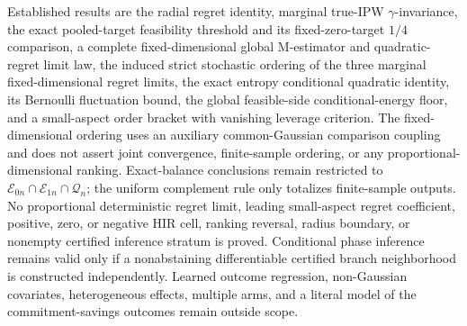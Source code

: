 \documentclass{article}
\begin{document}
Established results are the radial regret identity, marginal true-IPW \(\gamma\)-invariance, the exact pooled-target feasibility threshold and its fixed-zero-target \(1/4\) comparison, a complete fixed-dimensional global M-estimator and quadratic-regret limit law, the induced strict stochastic ordering of the three marginal fixed-dimensional regret limits, the exact entropy conditional quadratic identity, its Bernoulli fluctuation bound, the global feasible-side conditional-energy floor, and a small-aspect order bracket with vanishing leverage criterion. The fixed-dimensional ordering uses an auxiliary common-Gaussian comparison coupling and does not assert joint convergence, finite-sample ordering, or any proportional-dimensional ranking. Exact-balance conclusions remain restricted to \(\mathcal E_{0n}\cap\mathcal E_{1n}\cap\mathcal Q_n\); the uniform complement rule only totalizes finite-sample outputs. No proportional deterministic regret limit, leading small-aspect regret coefficient, positive, zero, or negative HIR cell, ranking reversal, radius boundary, or nonempty certified inference stratum is proved. Conditional phase inference remains valid only if a nonabstaining differentiable certified branch neighborhood is constructed independently. Learned outcome regression, non-Gaussian covariates, heterogeneous effects, multiple arms, and a literal model of the commitment-savings outcomes remain outside scope.
\end{document}
